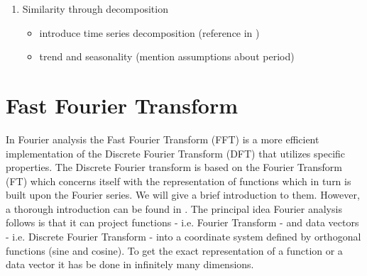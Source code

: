 \documentclass[phd,black, hidelinks]{PrincetonThesis}
\begin{document}
\begin{enumerate}
\item Similarity through decomposition
\label{sec:orgd8d461f}
\begin{itemize}
\item introduce time series decomposition (reference in \cite{hyndman2014forecasting})
\item trend and seasonality (mention assumptions about period)
\end{itemize}
\end{enumerate}
\section{Fast Fourier Transform}
\label{sec:org960db2f}
\label{orgb49bdde}
In Fourier analysis the Fast Fourier Transform (FFT) is a more efficient implementation of the Discrete Fourier Transform (DFT) that utilizes specific properties. The Discrete Fourier transform is based on the Fourier Transform (FT) which concerns itself with the representation of functions which in turn is built upon the Fourier series. We will give a brief introduction to them. However, a thorough introduction can be found in \cite{brunton2019data}. The principal idea Fourier analysis follows is that it can project functions - i.e. Fourier Transform - and data vectors - i.e. Discrete Fourier Transform - into a coordinate system defined by orthogonal functions (sine and cosine). To get the exact representation of a function or a data vector it has be done in infinitely many dimensions.
\end{document}
